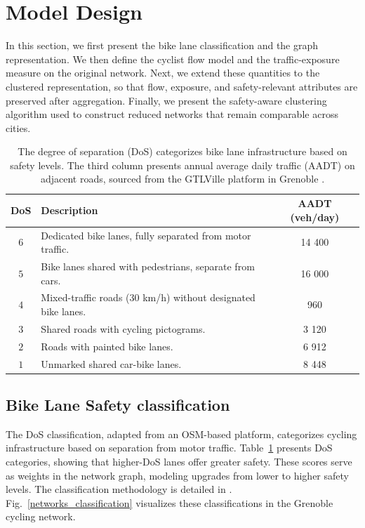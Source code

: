 \documentclass[lettersize,journal]{IEEEtran}
\begin{document}
\section{Model Design}
\label{model_design}
In this section, we first present the bike lane classification and the graph representation. We then define the cyclist flow model and the
traffic-exposure measure on the original network. Next, we extend these
quantities to the clustered representation, so that flow, exposure, and
safety-relevant attributes are preserved after aggregation. Finally, we present
the safety-aware clustering algorithm used to construct reduced networks that
remain comparable across cities.



\begin{table}[t]
\centering
\vspace{0.2cm}
\begin{tabular}{|c|p{5cm}|c|}
\hline
\textbf{DoS}   & \textbf{Description} & \textbf{AADT (veh/day)} \\
\hline
$6$  & Dedicated bike lanes, fully separated from motor traffic. & 14 400 \\

$5$  & Bike lanes shared with pedestrians, separate from cars. & 16 000 \\ 

$4$  & Mixed-traffic roads (30 km/h) without designated bike lanes. & 960  \\

$3$  & Shared roads with cycling pictograms. & 3 120 \\

$2$  & Roads with painted bike lanes.  & 6 912 \\

$1$  & Unmarked shared car-bike lanes. & 8 448 \\
\hline
\end{tabular}
\caption{\footnotesize The degree of separation (DoS) categorizes bike lane infrastructure based on safety levels. The third column presents annual average daily traffic (AADT) on adjacent roads, sourced from the GTLVille platform in Grenoble \cite{gtlville2024}.}
\label{dos_table}
\end{table}
\subsection{Bike Lane  Safety classification}


The DoS classification, adapted from an OSM-based platform, categorizes cycling infrastructure based on separation from motor traffic. Table~\ref{dos_table} presents DoS categories, showing that higher-DoS lanes offer greater safety. These scores serve as weights in the network graph, modeling upgrades from lower to higher safety levels. The classification methodology is detailed in \cite{2024graphbased}. Fig.~\ref{networks_classification} visualizes these classifications in the Grenoble cycling network.
\end{document}
